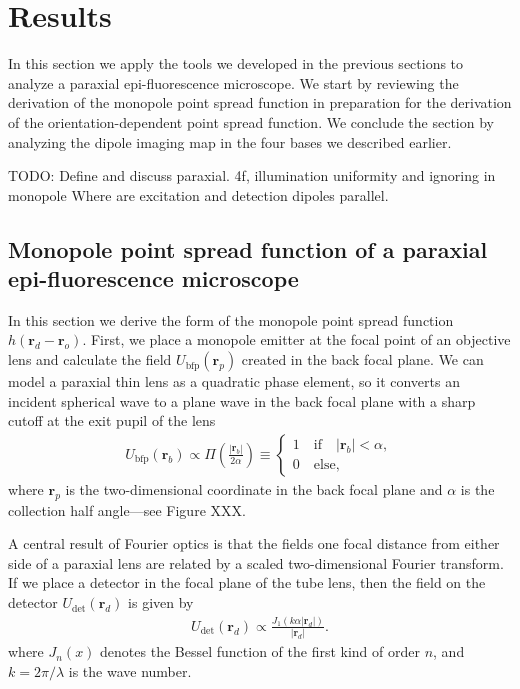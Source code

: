 \documentclass[]{osa-article}
\providecommand{\mb}[1]{\mathbf{#1}}
\providecommand{\ro}{\mathbf{\mathbf{r}}_o}
\providecommand{\rp}{\mathbf{r}_p}
\providecommand{\rd}{\mathbf{r}_d}
\begin{document}
    
 \section{Results}\label{sec:results}
In this section we apply the tools we developed in the previous sections to
analyze a paraxial epi-fluorescence microscope. We start by reviewing the
derivation of the monopole point spread function in preparation for the
derivation of the orientation-dependent point spread function. We conclude the
section by analyzing the dipole imaging map in the four bases we described
earlier.

TODO: Define and discuss paraxial. 4f, illumination uniformity and ignoring in
monopole Where are excitation and detection dipoles parallel.

\subsection{Monopole point spread function of a paraxial epi-fluorescence microscope}
In this section we derive the form of the monopole point spread function
$h(\rd - \ro)$. First, we place a monopole emitter at the focal point of an
objective lens and calculate the field $U_{\text{bfp}}(\rp)$ created in the back
focal plane. We can model a paraxial thin lens as a quadratic phase element, so
it converts an incident spherical wave to a plane wave in the back focal plane
with a sharp cutoff at the exit pupil of the lens
\begin{align}
  U_{\text{bfp}}(\mb{r}_b) \propto \Pi\left(\frac{|\mb{r}_b|}{2\alpha}\right) \equiv
  \begin{cases}
    1\quad \text{if}\quad |\mb{r}_b| < \alpha,\\
    0\quad \text{else},
  \end{cases}
\end{align}
where $\rp$ is the two-dimensional coordinate in the back focal plane and
$\alpha$ is the collection half angle---see Figure XXX. 

A central result of Fourier optics is that the fields one focal distance from
either side of a paraxial lens are related by a scaled two-dimensional Fourier
transform. If we place a detector in the focal plane of the tube lens, then the
field on the detector $U_{\text{det}}(\mb{r}_d)$ is given by
\begin{align}
  U_{\text{det}}(\mb{r}_d) \propto \frac{J_1(k\alpha|\mb{r}_d|)}{|\mb{r}_d|}.
\end{align}
where $J_n(x)$ denotes the Bessel function of the first kind of order $n$, and
$k = 2\pi/\lambda$ is the wave number.
\end{document}
